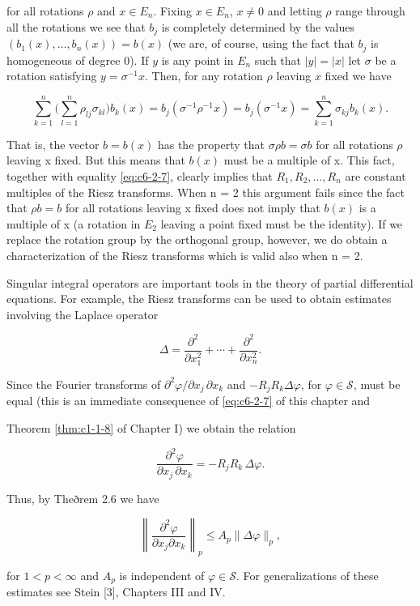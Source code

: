 for all rotations $\rho$ and $x \in E_n$. Fixing $x \in E_n$, $x \neq 0$ and letting $\rho$ range through all the rotations we see that $b_j$ is completely determined by the values $(b_1(x), \ldots, b_n(x)) = b(x)$ (we are, of course, using the fact that $b_j$ is homogeneous of degree 0). If $y$ is any point in $E_n$ such that $|y| = |x|$ let $\sigma$ be a rotation satisfying $y = \sigma^{-1}x$. Then, for any rotation $\rho$ leaving $x$ fixed we have

\[
\sum_{k=1}^{n}\bigg(\sum_{l=1}^{n}\rho_{l j}\sigma_{k l}\bigg)b_{k}(x)=b_{j}(\sigma^{-1}\rho^{-1}x)=b_{j}(\sigma^{-1}x)=\sum_{k=1}^{n}\sigma_{k j}b_{k}(x).
\]

That is, the vector $b = b(x)$ has the property that $\sigma\rho b = \sigma b$ for all rotations $\rho$ leaving x fixed. But this means that $b(x)$ must be a multiple of x. This fact, together with equality \eqref{eq:c6-2-7}, clearly implies that $R_1, R_2, \ldots, R_n$ are constant multiples of the Riesz transforms. When n = 2 this argument fails since the fact that $\rho b = b$ for all rotations leaving x fixed does not imply that $b(x)$ is a multiple of x (a rotation in $E_2$ leaving a point fixed must be the identity). If we replace the rotation group by the orthogonal group, however, we do obtain a characterization of the Riesz transforms which is valid also when n = 2.

 Singular integral operators are important tools in the theory of partial differential equations. For example, the Riesz transforms can be used to obtain estimates involving the Laplace operator

\[
\Delta=\frac{\partial^{2}}{\partial x_{1}^{2}}+\cdots+\frac{\partial^{2}}{\partial x_{n}^{2}}.
\]

Since the Fourier transforms of $\partial^2\varphi/\partial x_j\,\partial x_k$ and $-R_j R_k\Delta\varphi$, for $\varphi\in\mathcal{S}$, must be equal (this is an immediate consequence of \eqref{eq:c6-2-7} of this chapter and

Theorem \ref{thm:c1-1-8} of Chapter I) we obtain the relation

\[
\frac{\partial^{2}\varphi}{\partial x_{j}\,\partial x_{k}}=-R_{j}R_{k}\,\Delta\varphi.
\]

Thus, by Theðrem 2.6 we have

\[
\left\|\frac{\partial^{2}\varphi}{\partial x_{j}\partial x_{k}}\right\|_{p}\leq A_{p}\|\Delta\varphi\|_{p},
\]

for $1 < p < \infty$ and $A_p$ is independent of $\varphi \in \mathcal{S}$. For generalizations of these estimates see Stein [3], Chapters III and IV.

